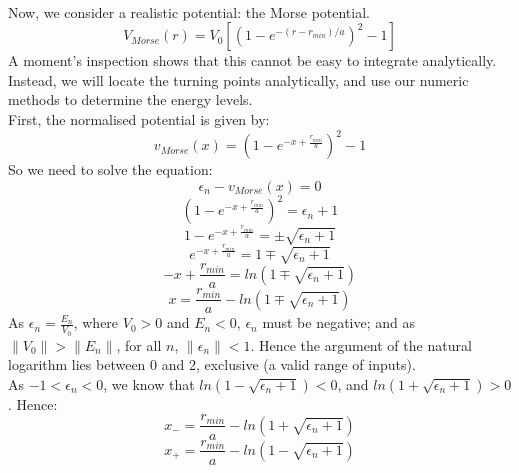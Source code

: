 \documentclass[10pt]{article}
\begin{document}
{\paragraph{}
Now, we consider a realistic potential: the Morse potential.
\begin{equation} V_{Morse}(r) = V_0 [(1-e^{-(r-r_{min})/a})^2 -1] \end{equation}
A moment's inspection shows that this cannot be easy to integrate analytically. Instead, we will locate the turning points analytically, and use our numeric methods to determine the energy levels. \\
First, the normalised potential is given by:
\begin{equation} v_{Morse}(x) = (1-e^{-x + \frac{r_{min}}{a}})^2 - 1 \end{equation}
So we need to solve the equation:
\begin{equation*} \epsilon_n - v_{Morse}(x) = 0 \end{equation*}
\begin{equation*} (1-e^{-x + \frac{r_{min}}{a}})^2 = \epsilon_n + 1 \end{equation*}
\begin{equation*} 1 - e^{-x + \frac{r_{min}}{a}} = \pm \sqrt{\epsilon_n + 1} \end{equation*}
\begin{equation*} e^{-x + \frac{r_{min}}{a}} = 1 \mp \sqrt{\epsilon_n + 1} \end{equation*}
\begin{equation*} -x + \frac{r_{min}}{a} = ln(1 \mp \sqrt{\epsilon_n + 1}) \end{equation*}
\begin{equation*} x = \frac{r_{min}}{a} - ln(1 \mp \sqrt{\epsilon_n + 1}) \end{equation*}
As $\epsilon_n = \frac{E_n}{V_0}$, where $V_0 > 0$ and $E_n < 0$, $\epsilon_n$ must be negative; and as $\|V_0\| > \|E_n\|$, for all $n$, $\|\epsilon_n\|<1$. Hence the argument of the natural logarithm lies between 0 and 2, exclusive (a valid range of inputs). \\
As $-1<\epsilon_n<0$, we know that $ln(1-\sqrt{\epsilon_n + 1}) < 0$, and $ln(1+\sqrt{\epsilon_n + 1})>0$. Hence:
\begin{equation*} x_- = \frac{r_{min}}{a} - ln(1+\sqrt{\epsilon_n + 1}) \end{equation*}
\begin{equation*} x_+ = \frac{r_{min}}{a} - ln(1-\sqrt{\epsilon_n + 1}) \end{equation*}

}
\end{document}
